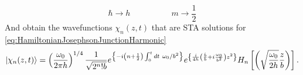 \documentclass{article}
\begin{document}
\begin{equation}
	\label{eq:SubstitutionHarmonicOscillatorBoseHubbard}
	\hbar \rightarrow h \hspace{5em} m \rightarrow \frac{1}{2}
\end{equation}
And obtain the wavefunctions $ \chi_{n}(z,t) $ that are STA solutions for \cref{eq:HamiltonianJosephsonJunctionHarmonic}
\begin{equation}
	\label{eq:STAWavefunctionBoseHubbard}
	\ket{\chi_{n}(z,t)} =
	\left(\frac{\omega_{0}}{ 2\pi h}\right)^{1/4} %
	\frac{1}{\sqrt{2^{n}!b} }e^{\left\{-i\left(n+\frac{1}{2}\right)\int_{0}^{t}dt~\omega_{0}/b^2\right\}} %
	e^{\left\{  \frac{i}{4h }\left(\frac{\dot{ b }}{b} + i\frac{\omega_{0}}{b^2}\right)z^2 \right\} } %
	H_{n}\left[\left(\sqrt{\frac{\omega_{0}}{2h }} \frac{z}{b}\right)\right] %
	.
\end{equation}
\end{document}
